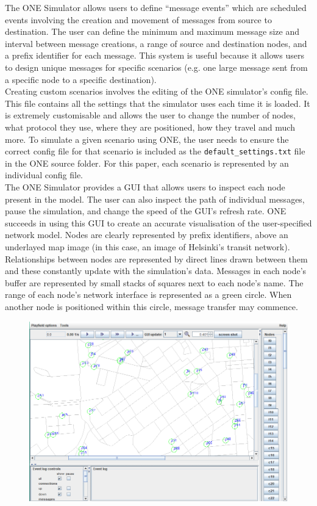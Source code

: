 \documentclass{article}
\begin{document}
\noindent The ONE Simulator allows users to define ``message events'' which are scheduled events involving the creation and movement of messages from source to destination. The user can define the minimum and maximum message size and interval between message creations, a range of source and destination nodes, and a prefix identifier for each message. This system is useful because it allows users to design unique messages for specific scenarios (e.g. one large message sent from a specific node to a specific destination).\\
\newline Creating custom scenarios involves the editing of the ONE simulator's config file. This file contains all the settings that the simulator uses each time it is loaded. It is extremely customisable and allows the user to change the number of nodes, what protocol they use, where they are positioned, how they travel and much more. To simulate a given scenario using ONE, the user needs to ensure the correct config file for that scenario is included as the \texttt{default\_settings.txt} file in the ONE source folder. For this paper, each scenario is represented by an individual config file.\\
\newline The ONE Simulator provides a GUI that allows users to inspect each node present in the model. The user can also inspect the path of individual messages, pause the simulation, and change the speed of the GUI's refresh rate. ONE succeeds in using this GUI to create an accurate visualisation of the user-specified network model. Nodes are clearly represented by prefix identifiers, above an underlayed map image (in this case, an image of Helsinki's transit network). Relationships between nodes are represented by direct lines drawn between them and these constantly update with the simulation's data. Messages in each node's buffer are represented by small stacks of squares next to each node's name. The range of each node's network interface is represented as a green circle. When another node is positioned within this circle, message transfer may commence.\\

\begin{figure}[h!]
\captionsetup{justification=centering, font=footnotesize}
\centering
  \includegraphics[width=.6\linewidth]{Screenshots/ONEGUI.png}
  \label{fig:test1}
\end{figure}
\end{document}
